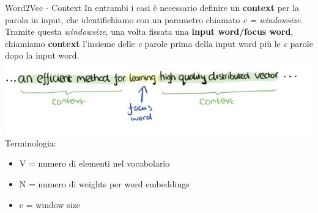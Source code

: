 \documentclass[british]{beamer}
\begin{document}
\begin{frame}{Word2Vec - Context}
	In entrambi i casi \`{e} necessario definire un \textbf{context} per la parola in input, che identifichiamo con un parametro chiamato \textit{c = windowsize}.
	Tramite questa \textit{windowsize}, una volta fissata una \textbf{input word/focus word}, chiamiamo \textbf{\alert{context}} l'insieme delle \textit{c} parole prima della input word pi\`{u} le \textit{c} parole dopo la input word.
	\includegraphics[width=1\linewidth,height=0.2\textwidth]{./Imgs/context}\\
	Terminologia:
	\begin{itemize}
		\item V = numero di elementi nel vocabolario
		\item N = numero di weights per word embeddings
		\item c = window size
	\end{itemize}
\end{frame}
\end{document}
